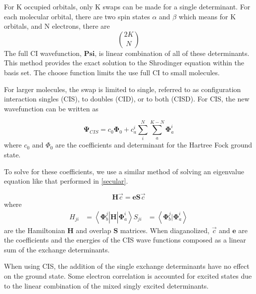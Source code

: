 	For K occupied orbitals, only K swaps can be made for a single determinant.
	For each molecular orbital, there are two spin states \(\alpha\) and \(\beta\) which means for K orbitals, and N electrons, there are
	\begin{equation}
	  2K \choose N
	\end{equation}
	The full CI wavefunction, \(\bm{Psi}\), is linear combination of all of these determinants.
This method provides the exact solution to the Shrodinger equation within the basis set.
	The choose function limits the use full CI to small molecules.

	For larger molecules, the swap is limited to single, referred to as configuration interaction singles (CIS), to doubles (CID), or to both (CISD).
	For CIS, the new wavefunction can be written as

	\begin{equation}
	\bm{\Psi}_{CIS} = c_0\bm{\Phi}_0 + c_a^i\sum_i^N\sum_a^{K-N}\bm{\Phi}_a^i
	\end{equation}
	where \(c_0\) and \(\Phi_0\) are the coefficients and determinant for the Hartree Fock ground state.

	To solve for these coefficients, we use a similar method of solving an eigenvalue equation like that performed in \ref{secular}.

	\begin{equation}
	  \bm{H}\vec{c} = \bm{e} \bm{S} \vec{c}
	\end{equation}
	where
	\begin{align}
	  H_{ji} &= \left<\bm{\Phi}_b^j \right| \bm{H} \left| \bm{\Phi}_a^i \right>
	  S_{ji} &= \left<\bm{\Phi}_b^j | \bm{\Phi}_a^i \right>
	\end{align}
	are the Hamiltonian \(\bm{H}\) and overlap \(\bm{S}\) matrices.
	When diaganolized, \(\vec{c}\) and \(\bm{e}\) are the coefficients and the energies of the CIS wave functions composed as a linear sum of the exchange determinants.

	When using CIS, the addition of the single exchange determinants have no effect on the ground state.
	Some electron correlation is accounted for excited states due to the linear combination of the mixed singly excited determinants.

